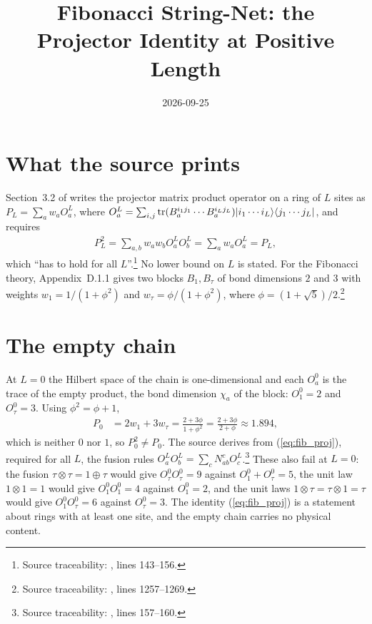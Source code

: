 \documentclass{article}
\title{Fibonacci String-Net: the Projector Identity at Positive Length}
\author{}
\date{2026-09-25}
\begin{document}
\maketitle
{}

\section{What the source prints}
Section~3.2 of \cite{Bultinck2017Anyons} writes the projector matrix product
operator on a ring of $L$ sites as $P_L=\sum_a w_aO_a^L$, where
$O_a^L=\sum_{i,j}\operatorname{tr}(B_a^{i_1j_1}\cdots B_a^{i_Lj_L})|i_1\cdots i_L\rangle\langle j_1\cdots j_L|$,
and requires
\begin{align}
    P_L^2=\sum_{a,b}w_aw_bO_a^LO_b^L=\sum_aw_aO_a^L=P_L,
    \label{eq:fib_proj}
\end{align}
which ``has to hold for all $L$''.\footnote{Source traceability:
    , lines 143--156.}
No lower bound on $L$ is stated. For the Fibonacci theory, Appendix~D.1.1
gives two blocks $B_1,B_\tau$ of bond dimensions $2$ and $3$ with weights
$w_1=1/(1+\phi^2)$ and $w_\tau=\phi/(1+\phi^2)$, where
$\phi=(1+\sqrt5)/2$.\footnote{Source traceability:
    , lines 1257--1269.}

\section{The empty chain}
At $L=0$ the Hilbert space of the chain is one-dimensional and each $O_a^0$ is
the trace of the empty product, the bond dimension $\chi_a$ of the block:
$O_1^0=2$ and $O_\tau^0=3$. Using $\phi^2=\phi+1$,
\begin{align}
    P_0
     & =2w_1+3w_\tau
    =\frac{2+3\phi}{1+\phi^2}
    =\frac{2+3\phi}{2+\phi}\approx1.894,
    \label{eq:fib_empty}
\end{align}
which is neither $0$ nor $1$, so $P_0^2\neq P_0$. The source derives from
(\ref{eq:fib_proj}), required for all $L$, the fusion rules
$O_a^LO_b^L=\sum_cN_{ab}^cO_c^L$.\footnote{Source traceability:
    , lines 157--160.}
These also fail at $L=0$: the fusion $\tau\otimes\tau=1\oplus\tau$ would give
$O_\tau^0O_\tau^0=9$ against $O_1^0+O_\tau^0=5$, the unit law $1\otimes1=1$ would
give $O_1^0O_1^0=4$ against $O_1^0=2$, and the unit laws $1\otimes\tau=\tau\otimes1=\tau$
would give $O_1^0O_\tau^0=6$ against $O_\tau^0=3$. The identity
(\ref{eq:fib_proj}) is a statement about rings with at least one site, and the
empty chain carries no physical content.
\end{document}

